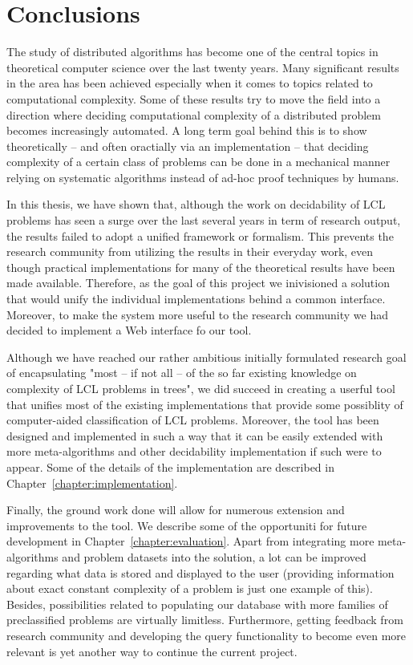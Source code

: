 \chapter{Conclusions}
\label{chapter:conclusions}

The study of distributed algorithms has become
one of the central topics in theoretical computer science
over the last twenty years. Many significant results in the area
has been achieved especially when it comes to topics related
to computational complexity. Some of these results
try to move the field into a direction where deciding
computational complexity of a distributed problem becomes
increasingly automated. A long term goal behind this is
to show theoretically -- and often oractially via an
implementation -- that deciding complexity of a certain class
of problems can be done in a mechanical manner relying
on systematic algorithms instead of ad-hoc proof techniques
by humans.

In this thesis, we have shown that, although the work on
decidability of LCL problems has seen a surge over the last
several years in term of research output, the results
failed to adopt a unified framework or formalism. This
prevents the research community from utilizing the
results in their everyday work, even though practical
implementations for many of the theoretical results have been
made available. Therefore, as the goal of this project we
inivisioned a solution that would unify the individual
implementations behind a common interface. Moreover, to make
the system more useful to the research community we had decided
to implement a Web interface fo our tool.

Although we have reached our rather ambitious initially formulated
research goal of encapsulating "most -- if not
all -- of
the so far existing knowledge on complexity of LCL
problems in trees", we did succeed in creating a userful
tool that unifies most of the existing implementations that
provide some possiblity of computer-aided classification of LCL
problems. Moreover, the tool has been designed and implemented in
such a way that it can be easily extended with more meta-algorithms
and other decidability implementation if such were to appear.
Some of the details of the implementation are described
in Chapter~\ref{chapter:implementation}.

Finally, the ground work done will allow for numerous
extension and improvements to the tool. We describe
some of the opportuniti for future development in
Chapter~\ref{chapter:evaluation}. Apart from
integrating more meta-algorithms and problem datasets into the
solution, a lot can be improved regarding what data
is stored and displayed to the user
(providing information about exact constant complexity of
a problem is just one example of this). Besides,
possibilities related to populating our database with more
families of preclassified problems are virtually limitless.
Furthermore, getting feedback from research community and
developing the query functionality to become even more
relevant is yet another way to continue the current
project.
